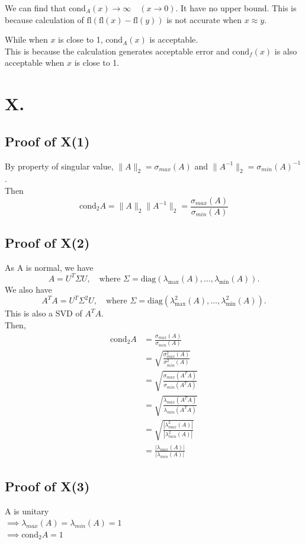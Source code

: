 \documentclass[a4paper]{article}
\begin{document}
We can find that $\text{cond}_A(x) \to \infty\quad(x \to 0)$. It have no upper bound.
This is because calculation of $\text{fl}(\text{fl}(x)-\text{fl}(y))$ is not accurate when $x \approx y$.

While when $x$ is close to 1, $\text{cond}_A(x)$ is acceptable.\\
This is because the calculation generates acceptable error and $\text{cond}_f(x)$ is also acceptable when $x$ is close to 1.

\section*{X.}

\subsection*{Proof of X(1)}
By property of singular value, $\|A\|_2=\sigma_{max}(A)$ and $\|A^{-1}\|_2=\sigma_{min}(A)^{-1}$.\\
Then $$\text{cond}_2A=\|A\|_2\|A^{-1}\|_2=\frac{\sigma_{max}(A)}{\sigma_{min}(A)}$$

\subsection*{Proof of X(2)}
As A is normal, we have
$$A=U^T \Sigma U, \quad \text{where } \Sigma=\mathrm{diag}(\lambda_{\max}(A), \ldots, \lambda_{\min}(A)).$$
We also have
$$A^TA=U^T \Sigma^2 U, \quad \text{where } \Sigma=\mathrm{diag}(\lambda_{\max}^2(A), \ldots, \lambda_{\min}^2(A)).$$
This is also a SVD of $A^TA$.\\
Then,
\begin{align*}
    \text{cond}_2A&=\frac{\sigma_{max}(A)}{\sigma_{min}(A)}\\
    &=\sqrt{\frac{\sigma_{max}^2(A)}{\sigma_{min}^2(A)}}\\
    &=\sqrt{\frac{\sigma_{max}(A^TA)}{\sigma_{min}(A^TA)}}\\
    &=\sqrt{\frac{\lambda_{max}(A^TA)}{\lambda_{min}(A^TA)}}\\
    &=\sqrt{\frac{|\lambda_{max}^2(A)|}{|\lambda_{min}^2(A)|}}\\
    &=\frac{|\lambda_{max}(A)|}{|\lambda_{min}(A)|}
\end{align*}

\subsection*{Proof of X(3)}
A is unitary\\
$\implies \lambda_{max}(A)=\lambda_{min}(A)=1$\\
$\implies \text{cond}_2A=1$
\end{document}
